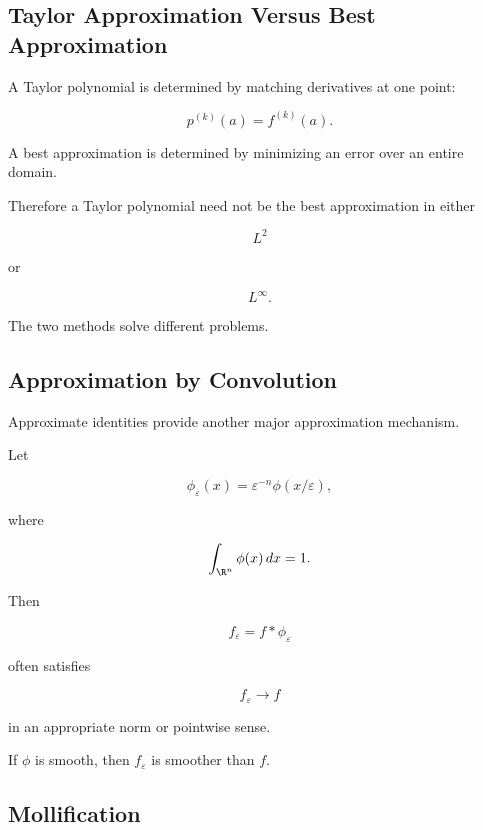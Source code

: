 \subsection{Taylor Approximation Versus Best Approximation}
\label{subsec:taylor-versus-best-approximation}

A Taylor polynomial is determined by matching derivatives at one point:

\[
\boxed{
p^{(k)}(a)=f^{(k)}(a).
}
\]

A best approximation is determined by minimizing an error over an entire
domain.

Therefore a Taylor polynomial need not be the best approximation in
either

\[
L^2
\]

or

\[
L^\infty.
\]

The two methods solve different problems.

\subsection{Approximation by Convolution}
\label{subsec:approximation-convolution}

Approximate identities provide another major approximation mechanism.

Let

\[
\phi_\varepsilon(x)
=
\varepsilon^{-n}
\phi(x/\varepsilon),
\]

where

\[
\int_{\R^n}\phi(x)\,dx=1.
\]

Then

\[
\boxed{
f_\varepsilon
=
f*\phi_\varepsilon
}
\]

often satisfies

\[
\boxed{
f_\varepsilon\to f
}
\]

in an appropriate norm or pointwise sense.

If \(\phi\) is smooth, then \(f_\varepsilon\) is smoother than \(f\).

\subsection{Mollification}
\label{subsec:approximation-mollification}

